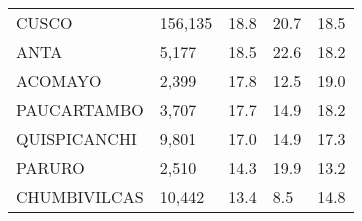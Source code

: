 \begin{tabular}{lllll}
	\cellcolor[HTML]{FF5050}CUSCO                                  & 156,135                                                               & 18.8                                                                             & 20.7                                                                        & 18.5                                                                                \\
	\cellcolor[HTML]{FF5050}ANTA                                   & 5,177                                                                 & 18.5                                                                             & 22.6                                                                        & 18.2                                                                                \\
	\cellcolor[HTML]{FF5050}ACOMAYO                                & 2,399                                                                 & 17.8                                                                             & 12.5                                                                        & 19.0                                                                                \\
	\cellcolor[HTML]{FF5050}PAUCARTAMBO                            & 3,707                                                                 & 17.7                                                                             & 14.9                                                                        & 18.2                                                                                \\
	\cellcolor[HTML]{FF5050}QUISPICANCHI                           & 9,801                                                                 & 17.0                                                                             & 14.9                                                                        & 17.3                                                                                \\
	\cellcolor[HTML]{FF5050}PARURO                                 & 2,510                                                                 & 14.3                                                                             & 19.9                                                                        & 13.2                                                                                \\
	\cellcolor[HTML]{FF5050}CHUMBIVILCAS                           & 10,442                                                                & 13.4                                                                             & 8.5                                                                         & 14.8                                                                                \\

\end{tabular}
